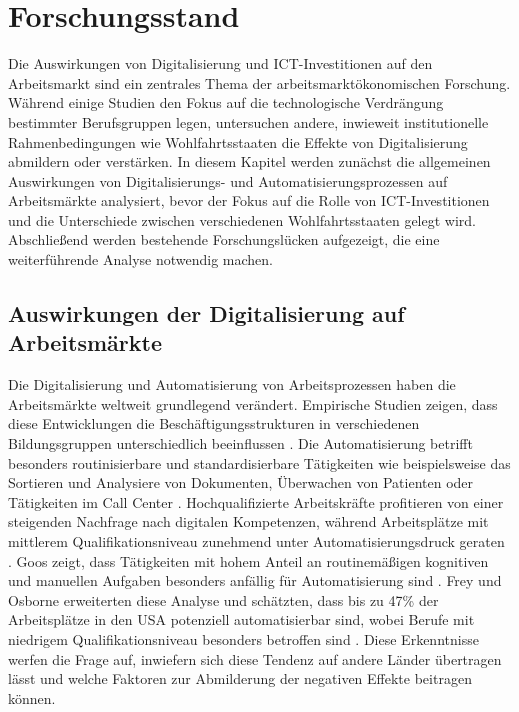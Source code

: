 
\section{Forschungsstand}

Die Auswirkungen von Digitalisierung und \ac{ICT}-Investitionen auf den Arbeitsmarkt sind ein 
zentrales Thema der arbeitsmarktökonomischen Forschung. Während einige Studien den Fokus auf die 
technologische Verdrängung bestimmter Berufsgruppen legen, untersuchen andere, inwieweit 
institutionelle Rahmenbedingungen wie Wohlfahrtsstaaten die Effekte von Digitalisierung abmildern 
oder verstärken. In diesem Kapitel werden zunächst die allgemeinen Auswirkungen von 
Digitalisierungs- und Automatisierungsprozessen auf Arbeitsmärkte analysiert, bevor der Fokus auf 
die Rolle von \ac{ICT}-Investitionen und die Unterschiede zwischen verschiedenen 
Wohlfahrtsstaaten gelegt wird. Abschließend werden bestehende Forschungslücken aufgezeigt, die 
eine weiterführende Analyse notwendig machen.


\subsection{Auswirkungen der Digitalisierung auf Arbeitsmärkte}

Die Digitalisierung und Automatisierung von Arbeitsprozessen haben die Arbeitsmärkte weltweit 
grundlegend verändert. Empirische Studien zeigen, dass diese Entwicklungen die 
Beschäftigungsstrukturen in verschiedenen Bildungsgruppen unterschiedlich beeinflussen 
\parencite[vgl.][S. 1588-1590]{autor2013thegrowth}. Die Automatisierung betrifft besonders 
routinisierbare und standardisierbare Tätigkeiten wie beispielsweise das Sortieren und Analysiere 
von Dokumenten, Überwachen von Patienten oder Tätigkeiten im Call Center 
\parencite[vgl.][S. 19-20]{frey2013thefuture}. Hochqualifizierte Arbeitskräfte profitieren von 
einer steigenden Nachfrage nach digitalen Kompetenzen, während Arbeitsplätze mit mittlerem 
Qualifikationsniveau zunehmend unter Automatisierungsdruck geraten 
\parencite[vgl.][S. 2509–2510]{goos2014explaining}. Goos zeigt, dass Tätigkeiten mit hohem Anteil 
an routinemäßigen kognitiven und manuellen Aufgaben besonders anfällig für Automatisierung sind 
\parencite[vgl.][S. 2521]{goos2014explaining}. Frey und Osborne erweiterten diese Analyse und 
schätzten, dass bis zu 47\% der Arbeitsplätze in den USA potenziell automatisierbar sind, wobei 
Berufe mit niedrigem Qualifikationsniveau besonders betroffen sind 
\parencite[S. 39-41]{frey2013thefuture}. Diese Erkenntnisse  werfen die Frage auf, inwiefern sich 
diese Tendenz auf andere Länder übertragen lässt und welche Faktoren zur Abmilderung der 
negativen Effekte beitragen können.

